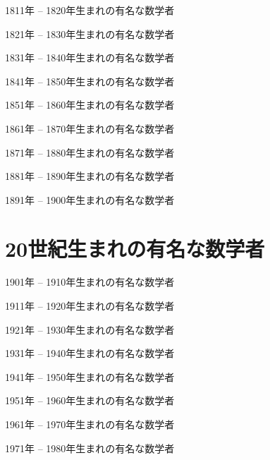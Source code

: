\documentclass[a4paper,12pt,dvipdfmx]{jsarticle}
\theoremstyle{plain}
\theoremstyle{remark}  %
\theoremstyle{definition}  %
\begin{document}
1811年 -- 1820年生まれの有名な数学者

1821年 -- 1830年生まれの有名な数学者

1831年 -- 1840年生まれの有名な数学者

1841年 -- 1850年生まれの有名な数学者

1851年 -- 1860年生まれの有名な数学者

1861年 -- 1870年生まれの有名な数学者

1871年 -- 1880年生まれの有名な数学者

1881年 -- 1890年生まれの有名な数学者

1891年 -- 1900年生まれの有名な数学者

\section{20世紀生まれの有名な数学者}
1901年 -- 1910年生まれの有名な数学者

1911年 -- 1920年生まれの有名な数学者

1921年 -- 1930年生まれの有名な数学者

1931年 -- 1940年生まれの有名な数学者

1941年 -- 1950年生まれの有名な数学者

1951年 -- 1960年生まれの有名な数学者

1961年 -- 1970年生まれの有名な数学者

1971年 -- 1980年生まれの有名な数学者




\end{document}
